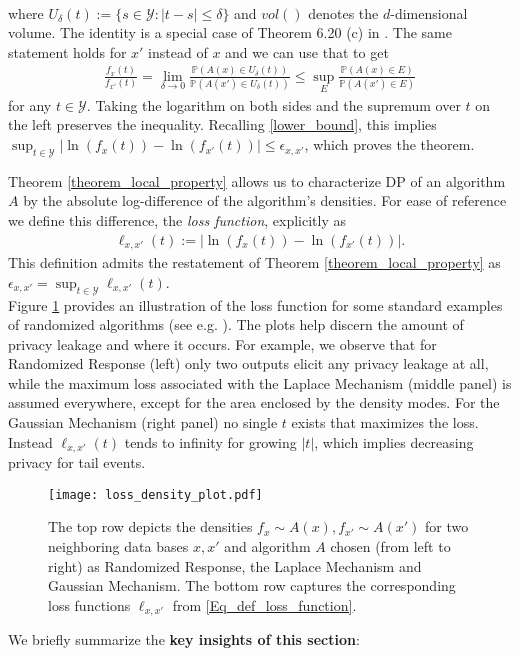 \documentclass[conference]{IEEEtran}
\begin{document}
\begin{IEEEproof}
\begin{align*}
\end{align*}
where $U_\delta(t):=\{s \in \mathcal{Y}: |t-s|\le \delta \}$ and  $vol()$ denotes the $d$-dimensional volume. The identity is a special case of Theorem 6.20 (c) in \cite{Knapp2005}. The same statement holds for $x'$ instead of $x$ and we can use that to get
\begin{align*}
    \frac{f_x(t)}{f_{x'}(t)} = \lim\limits_{\delta \to 0} \frac{\mathbb{P}(A(x) \in U_\delta(t))}{\mathbb{P}(A(x') \in U_\delta(t))} \leq \sup\limits_{E} \frac{\mathbb{P}(A(x) \in E)}{\mathbb{P}(A(x') \in E)}
\end{align*}
for any $t \in \mathcal{Y}$. Taking the logarithm on both sides and the supremum over $t$ on the left preserves the inequality. Recalling \eqref{lower_bound}, this  implies $  \sup_{t \in \mathcal{Y}} \big| \ln (f_x(t)) - \ln (f_{x'}(t)) \big|\le \epsilon_{x,x'}$, which proves the theorem. 
\end{IEEEproof} 
$ $\\

Theorem \ref{theorem_local_property} allows us to characterize DP of an algorithm 
$A$ by the absolute log-difference of the algorithm's densities. For ease of reference we define this difference, the \textit{loss function}, explicitly as
\begin{align} \label{Eq_def_loss_function}
\ell_{x,x'}(t) := \big| \ln (f_x(t)) - \ln (f_{x'}(t)) \big|. 
\end{align}
This definition admits the restatement of Theorem \ref{theorem_local_property} as $\epsilon_{x,x'} = \sup_{t \in \mathcal{Y}}\ell_{x,x'}(t)$. \\

Figure \ref{standard_examples} provides an illustration of the loss function for some standard examples of randomized algorithms (see e.g. \cite{Dwork2014, Kairouz2016}). The plots help discern the amount of privacy leakage and where it occurs. For example, we observe that for Randomized Response (left) only two outputs elicit any privacy leakage at all, while the maximum loss associated with the  Laplace Mechanism (middle panel) is assumed everywhere, except for the area enclosed by the density modes.
For the Gaussian Mechanism (right panel) no single $t$ exists that maximizes the loss. Instead $\ell_{x,x'}(t)$ tends to infinity for growing $|t|$, which implies decreasing privacy for tail events.



\begin{figure}[H] 
\centering
\texttt{[image: loss\_density\_plot.pdf]}\\
\caption{The top row depicts the densities $f_x \sim A(x), f_{x'} \sim A(x')$ for two neighboring data bases $x,x'$ and algorithm $A$ chosen (from left to right) as Randomized Response, the Laplace Mechanism and Gaussian Mechanism. The bottom row captures the corresponding loss functions $\ell_{x,x'}$ from \eqref{Eq_def_loss_function}.} \label{standard_examples}
\end{figure}
\noindent We briefly summarize the \textbf{key insights of this section}:\\
\end{document}
